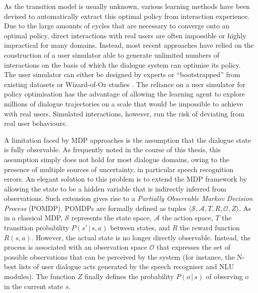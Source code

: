As the transition model is usually unknown, various learning methods have been devised to automatically extract this optimal policy from interaction experience. Due to the large amounts of cycles that are necessary to converge onto an optimal policy, direct interactions with real users are often impossible or highly impractical for many domains. Instead, most recent approaches have relied on the construction of a user simulator able to generate unlimited numbers of interactions on the basis of which the dialogue system can optimise its policy.  
The user simulator can either be designed by experts  or ``bootstrapped'' from existing datasets  or Wizard-of-Oz studies \citep{InTech_RL_2008_OP,FramptonL09}. The reliance on a user simulator for policy optimisation has the advantage of allowing the learning agent to explore millions of dialogue trajectories on a scale that would be impossible to achieve with real users.  Simulated interactions, however, run the risk of deviating from real user behaviours.

A limitation faced by MDP approaches is the assumption that the dialogue state is fully observable. As frequently noted in the course of this thesis, this assumption simply does not hold for most dialogue domains, owing to the presence of multiple sources of uncertainty, in particular speech recognition errors.  An elegant solution to this problem is to extend the MDP framework by allowing the state to be a hidden variable that is indirectly inferred from observations.  Such extension gives rise to a  \textit{Partially Observable Markov Decision Process} (POMDP).  POMDPs are formally defined as tuples $\langle \mathcal{S}, \mathcal{A}, T, R, \mathcal{O}, Z \rangle$.  As in a classical MDP, $\mathcal{S}$ represents the state space, $\mathcal{A}$ the action space, $T$ the transition probability $P(s'\, | \, s,a)$ between states, and $R$ the reward function $R(s,a)$.  However, the actual state is no longer directly observable.  Instead, the process is associated with an observation space $\mathcal{O}$ that expresses the set of possible observations that can be perceived by the system (for instance, the N-best lists of user dialogue acts generated by the speech recogniser and NLU modules). The function $Z$ finally defines the probability $P(o\, | \, s)$ of observing $o$ in the current state $s$.  


